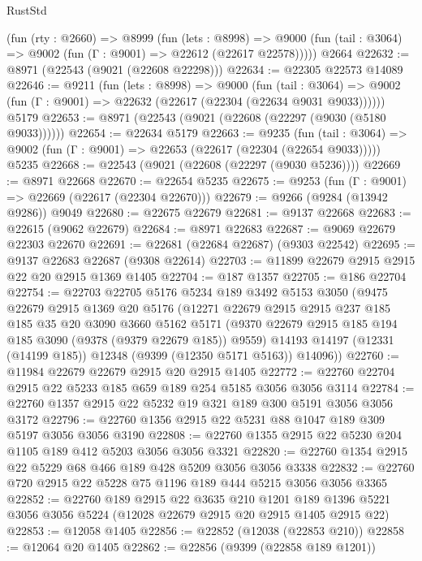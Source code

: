 \begin{lexlean}{RustStd}
\begin{coremodule}
    (fun (rty : @2660) =>
    @8999
      (fun (lets : @8998) =>
      @9000 (fun (tail : @3064) => @9002 (fun (Γ : @9001) => @22612 (@22617 @22578)))))
    @2664
@22632 := @8971 (@22543 (@9021 (@22608 @22298)))
@22634 := @22305 @22573 @14089
@22646 := @9211
    (fun (lets : @8998) =>
    @9000
      (fun (tail : @3064) =>
      @9002 (fun (Γ : @9001) => @22632 (@22617 (@22304 (@22634 @9031 @9033))))))
    @5179
@22653 := @8971 (@22543 (@9021 (@22608 (@22297 (@9030 (@5180 @9033))))))
@22654 := @22634 @5179
@22663 := @9235
    (fun (tail : @3064) => @9002 (fun (Γ : @9001) => @22653 (@22617 (@22304 (@22654 @9033)))))
    @5235
@22668 := @22543 (@9021 (@22608 (@22297 (@9030 @5236))))
@22669 := @8971 @22668
@22670 := @22654 @5235
@22675 := @9253 (fun (Γ : @9001) => @22669 (@22617 (@22304 @22670)))
@22679 := @9266 (@9284 (@13942 @9286)) @9049
@22680 := @22675 @22679
@22681 := @9137 @22668
@22683 := @22615 (@9062 @22679)
@22684 := @8971 @22683
@22687 := @9069 @22679 @22303 @22670
@22691 := @22681 (@22684 @22687) (@9303 @22542)
@22695 := @9137 @22683 @22687 (@9308 @22614)
@22703 := @11899 @22679 @2915 @2915 @22 @20 @2915 @1369 @1405
@22704 := @187 @1357
@22705 := @186 @22704
@22754 := @22703
    @22705
    @5176
    @5234
    @189
    @3492
    @5153
    @3050
    (@9475
      @22679
      @2915
      @1369
      @20
      @5176
      (@12271
        @22679
        @2915
        @2915
        @237
        @185
        @185
        @35
        @20
        @3090
        @3660
        @5162
        @5171
        (@9370 @22679 @2915 @185 @194 @185 @3090 (@9378 (@9379 @22679 @185)) @9559)
        @14193
        @14197
        (@12331 (@14199 @185))
        @12348
        (@9399 (@12350 @5171 @5163))
        @14096))
@22760 := @11984 @22679 @22679 @2915 @20 @2915 @1405
@22772 := @22760 @22704 @2915 @22 @5233 @185 @659 @189 @254 @5185 @3056 @3056 @3114
@22784 := @22760 @1357 @2915 @22 @5232 @19 @321 @189 @300 @5191 @3056 @3056 @3172
@22796 := @22760 @1356 @2915 @22 @5231 @88 @1047 @189 @309 @5197 @3056 @3056 @3190
@22808 := @22760 @1355 @2915 @22 @5230 @204 @1105 @189 @412 @5203 @3056 @3056 @3321
@22820 := @22760 @1354 @2915 @22 @5229 @68 @466 @189 @428 @5209 @3056 @3056 @3338
@22832 := @22760 @720 @2915 @22 @5228 @75 @1196 @189 @444 @5215 @3056 @3056 @3365
@22852 := @22760
    @189
    @2915
    @22
    @3635
    @210
    @1201
    @189
    @1396
    @5221
    @3056
    @3056
    @5224
    (@12028 @22679 @2915 @20 @2915 @1405 @2915 @22)
@22853 := @12058 @1405
@22856 := @22852 (@12038 (@22853 @210))
@22858 := @12064 @20 @1405
@22862 := @22856 (@9399 (@22858 @189 @1201))

\end{coremodule}
\end{lexlean}
